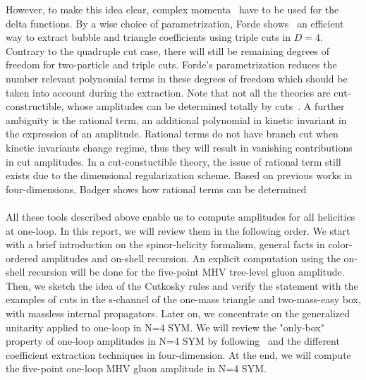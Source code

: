 However, to make this idea clear, complex momenta~\cite{PhysRevD.75.025028} have to be used for the delta functions.
By a wise choice of parametrization, Forde shows~\cite{Forde:2007mi} an efficient way to extract bubble and triangle coefficients using triple cuts in $D=4$.
Contrary to the quadruple cut case, there will still be remaining degrees of freedom for two-particle and triple cuts. 
Forde's parametrization reduces the number relevant polynomial terms in these degrees of freedom which should be taken into account during the extraction. 
Note that not all the theories are cut-constructible, \ie whose amplitudes can be determined totally by cuts~\cite{Bern:1994cg}. 
A further ambiguity is the rational term, \ie an additional polynomial in kinetic invariant in the expression of an amplitude. 
Rational terms do not have branch cut when kinetic invariants change regime, thus they will result in vanishing contributions in cut amplitudes.
In a cut-constuctible theory, the issue of rational term still exists due to the dimensional regularization scheme. 
Based on previous works in four-dimensions, Badger shows how rational terms can be determined~\cite{Badger:2008cm}
\\\\
All these tools described above enable us to compute amplitudes for all helicities at one-loop.
In this report, we will review them in the following order.
We start with a brief introduction on the spinor-helicity formalism, general facts in color-ordered amplitudes and on-shell recursion.
An explicit computation using the on-shell recursion will be done for the five-point MHV tree-level gluon amplitude. 
Then, we sketch the idea of the Cutkosky rules and verify the statement with the examples of cuts in the s-channel of the one-mass triangle and two-mass-easy box, with massless internal propagators.
Later on, we concentrate on the generalized unitarity applied to one-loop in N=4 SYM.
We will review the "only-box" property of one-loop amplitudes in N=4 SYM by following~\cite{Bern:1994zx} and the different coefficient extraction techniques in four-dimension. 
At the end, we will compute the five-point one-loop MHV gluon amplitude in N=4 SYM.











